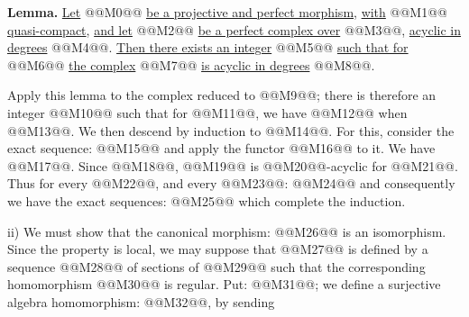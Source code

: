 \textbf{Lemma.} \uline{Let} @@M0@@ \uline{be a projective and perfect morphism}, \uline{with} @@M1@@ \uline{quasi-compact}, \uline{and let} @@M2@@ \uline{be a perfect complex over} @@M3@@, \uline{acyclic in degrees} @@M4@@. \uline{Then there exists an integer} @@M5@@ \uline{such that for} @@M6@@ \uline{the complex} @@M7@@ \uline{is acyclic in degrees} @@M8@@.

Apply this lemma to the complex reduced to @@M9@@; there is therefore an integer @@M10@@ such that for @@M11@@, we have @@M12@@ when @@M13@@. We then descend by induction to @@M14@@. For this, consider the exact sequence:
@@M15@@
and apply the functor @@M16@@ to it. We have @@M17@@. Since @@M18@@, @@M19@@ is @@M20@@-acyclic for @@M21@@. Thus for every @@M22@@, and every @@M23@@:
@@M24@@
and consequently we have the exact sequences:
@@M25@@
which complete the induction.

ii) We must show that the canonical morphism:
@@M26@@
is an isomorphism. Since the property is local, we may suppose that @@M27@@ is defined by a sequence @@M28@@ of sections of @@M29@@ such that the corresponding homomorphism @@M30@@ is regular. Put: @@M31@@; we define a surjective algebra homomorphism: @@M32@@, by sending
